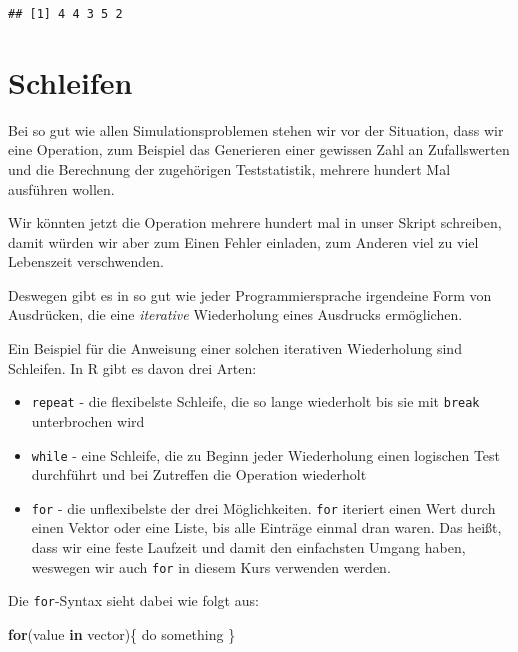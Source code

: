 \documentclass[
]{book}
\newenvironment{Shaded}{\begin{snugshade}}{\end{snugshade}}
\newcommand{\ControlFlowTok}[1]{\textcolor[rgb]{0.13,0.29,0.53}{\textbf{#1}}}
\newcommand{\NormalTok}[1]{#1}
\begin{document}
\begin{verbatim}
## [1] 4 4 3 5 2
\end{verbatim}

\hypertarget{schleifen}{%
\chapter{Schleifen}\label{schleifen}}

Bei so gut wie allen Simulationsproblemen stehen wir vor der Situation, dass wir eine Operation, zum Beispiel das Generieren einer gewissen Zahl an Zufallswerten und die Berechnung der zugehörigen Teststatistik, mehrere hundert Mal ausführen wollen.

Wir könnten jetzt die Operation mehrere hundert mal in unser Skript schreiben, damit würden wir aber zum Einen Fehler einladen, zum Anderen viel zu viel Lebenszeit verschwenden.

Deswegen gibt es in so gut wie jeder Programmiersprache irgendeine Form von Ausdrücken, die eine \emph{iterative} Wiederholung eines Ausdrucks ermöglichen.

Ein Beispiel für die Anweisung einer solchen iterativen Wiederholung sind Schleifen.
In R gibt es davon drei Arten:

\begin{itemize}
\item
  \texttt{repeat} - die flexibelste Schleife, die so lange wiederholt bis sie mit \texttt{break} unterbrochen wird
\item
  \texttt{while} - eine Schleife, die zu Beginn jeder Wiederholung einen logischen Test durchführt und bei Zutreffen die Operation wiederholt
\item
  \texttt{for} - die unflexibelste der drei Möglichkeiten. \texttt{for} iteriert einen Wert durch einen Vektor oder eine Liste, bis alle Einträge einmal dran waren. Das heißt, dass wir eine feste Laufzeit und damit den einfachsten Umgang haben, weswegen wir auch \texttt{for} in diesem Kurs verwenden werden.
\end{itemize}

Die \texttt{for}-Syntax sieht dabei wie folgt aus:

\begin{Shaded}
\begin{Highlighting}[]
\ControlFlowTok{for}\NormalTok{(value }\ControlFlowTok{in}\NormalTok{ vector)\{}
\NormalTok{  do something}
\NormalTok{\}}
\end{Highlighting}
\end{Shaded}
\end{document}
